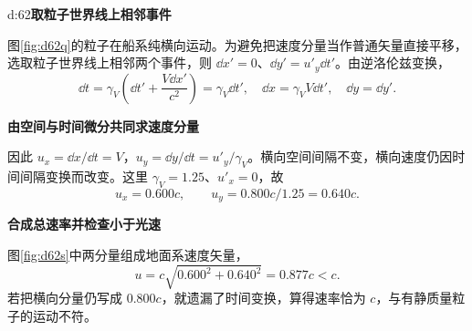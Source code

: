 \begin{drillsolution}{d:62}\textbf{取粒子世界线上相邻事件}\par\nobreak
图\ref{fig:d62q}的粒子在船系纯横向运动。为避免把速度分量当作普通矢量直接平移，选取粒子世界线上相邻两个事件，则 \(\dd x'=0\)、\(\dd y'=u'_y\dd t'\)。由逆洛伦兹变换，
\[
 \dd t=\gamma_V\left(\dd t'+\frac{V\dd x'}{c^2}\right)=\gamma_V\dd t',
 \quad \dd x=\gamma_VV\dd t',\quad \dd y=\dd y'.
\]


\par\medskip{}\noindent\textbf{由空间与时间微分共同求速度分量}\par\nobreak
因此 \(u_x=\dd x/\dd t=V\)，\(u_y=\dd y/\dd t=u'_y/\gamma_V\)。横向空间间隔不变，横向速度仍因时间间隔变换而改变。这里 \(\gamma_V=1.25\)、\(u'_x=0\)，故
\[
 \boxed{u_x=0.600c},\qquad
 \boxed{u_y=0.800c/1.25=0.640c}.
\]


\par\medskip{}\noindent\textbf{合成总速率并检查小于光速}\par\nobreak
图\ref{fig:d62s}中两分量组成地面系速度矢量，
\[
 \boxed{u=c\sqrt{0.600^2+0.640^2}=0.877c<c}.
\]
若把横向分量仍写成 \(0.800c\)，就遗漏了时间变换，算得速率恰为 \(c\)，与有静质量粒子的运动不符。
\end{drillsolution}

